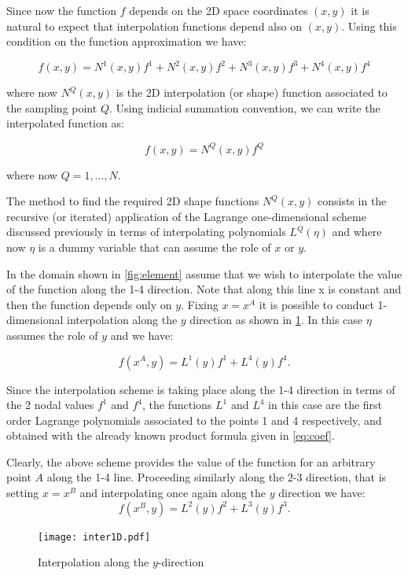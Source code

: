 Since now the function $f$ depends on the 2D space coordinates $(x , y)$ it is natural to expect that interpolation functions depend also on $(x , y)$. Using this condition on the function approximation we have:

\[f(x,y) = N^1(x,y)f^1 + N^2(x,y)f^2 + N^3(x,y)f^3 + N^4(x,y)f^4\]

where now $N^Q(x,y)$ is the 2D interpolation (or shape) function associated to the sampling point $Q$. Using indicial summation convention, we can write the interpolated function as:

\[f(x,y) = N^Q(x,y)f^Q\]

where now $Q = 1,...,N$.


The method to find the required 2D shape functions $N^Q(x,y)$ consists in the recursive (or iterated) application of the Lagrange one-dimensional scheme discussed previously in terms of interpolating polynomials $L^Q(\eta)$ and where now $\eta$ is a dummy variable that can assume the role of $x$ or $y$.

In the domain shown in  \cref{fig:element} assume that we wish to interpolate the value of the function along the 1-4 direction. Note that along this line x is constant and then the function depends only on $y$. Fixing $x = x^A$ it is possible to conduct 1-dimensional interpolation along the $y$ direction as shown in \cref{fig:onedimn}. In this case $\eta$ assumes the role of $y$ and we have:

\[f(x^A,y) = L^1(y)f^1 + L^4(y)f^4.\]

Since the interpolation scheme is taking place along the 1-4 direction in terms of the 2 nodal values $f^1$ and $f^4$, the functions $L^1$ and $L^4$ in this case are the first order Lagrange polynomials associated to the points 1 and 4 respectively, and obtained with the already known product formula given in \cref{eq:coef}.



Clearly, the above scheme provides the value of the function for an arbitrary point $A$ along the 1-4 line. Proceeding similarly along the 2-3 direction, that is setting $x = x^B$ and interpolating once again along the $y$ direction we have:
\[f(x^B,y) = L^2(y)f^2 + L^3(y)f^3.\]

\begin{figure}[H]
\centering
\texttt{[image: inter1D.pdf]}
\caption{Interpolation along the $y$-direction}
\label{fig:onedimn}
\end{figure}



